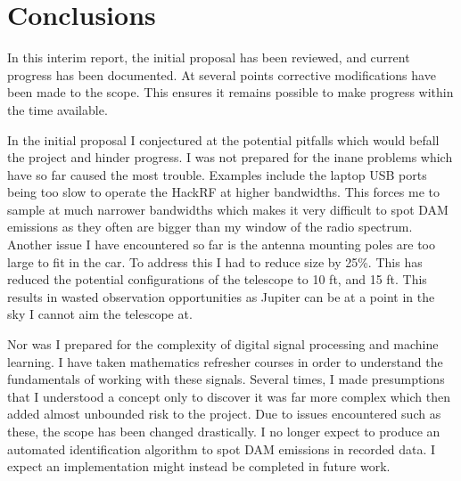 \documentclass[runningheads,a4paper]{llncs}
\begin{document}
%
%
\newpage
\chapter*{Conclusions}


In this interim report, the initial proposal has been reviewed, and current progress has been documented. At several points corrective modifications have been made to the scope. This ensures it remains possible to make progress within the time available. 

In the initial proposal I conjectured at the potential pitfalls which would befall the project and hinder progress. I was not prepared for the inane problems which have so far caused the most trouble. Examples include the laptop USB ports being too slow to operate the HackRF at higher bandwidths. This forces me to sample at much narrower bandwidths which makes it very difficult to spot \gls{DAM} emissions as they often are bigger than my window of the radio spectrum. Another issue I have encountered so far is the antenna mounting poles are too large to fit in the car. To address this I had to reduce size by 25\%. This has reduced the potential configurations of the telescope to 10 ft, and 15 ft. This results in wasted observation opportunities as Jupiter can be at a point in the sky I cannot aim the telescope at.

Nor was I prepared for the complexity of digital signal processing and machine learning. I have taken mathematics refresher courses in order to understand the fundamentals of working with these signals. Several times, I made presumptions that I understood a concept only to discover it was far more complex which then added almost unbounded risk to the project. Due to issues encountered such as these, the scope has been changed drastically. I no longer expect to produce an automated identification algorithm to spot \gls{DAM} emissions in recorded data. I expect an implementation might instead be completed in future work. 
\end{document}
